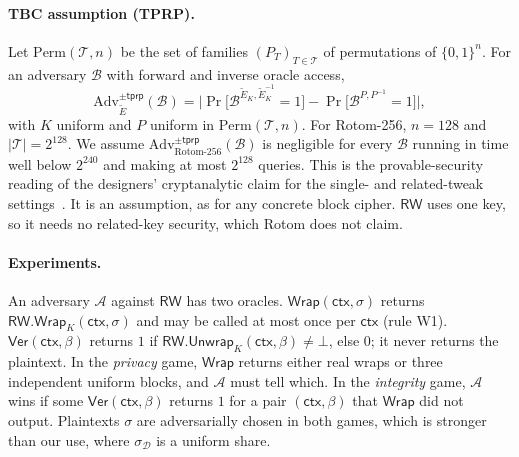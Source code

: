 \documentclass[11pt]{article}
\theoremstyle{remark}
\begin{document}
\paragraph{TBC assumption (TPRP).} Let $\mathrm{Perm}(\mathcal{T}, n)$ be the set of families $(P_T)_{T\in\mathcal{T}}$ of permutations of $\{0,1\}^n$. For an adversary $\mathcal{B}$ with forward and inverse oracle access,
\[
\mathrm{Adv}^{\pm\mathsf{tprp}}_{\widetilde{E}}(\mathcal{B}) = \Big|\Pr\big[\mathcal{B}^{\widetilde{E}_K, \widetilde{E}_K^{-1}} = 1\big] - \Pr\big[\mathcal{B}^{P, P^{-1}} = 1\big]\Big|,
\]
with $K$ uniform and $P$ uniform in $\mathrm{Perm}(\mathcal{T}, n)$. For Rotom-256, $n = 128$ and $|\mathcal{T}| = 2^{128}$. We assume $\mathrm{Adv}^{\pm\mathsf{tprp}}_{\mathrm{Rotom}\text{-}256}(\mathcal{B})$ is negligible for every $\mathcal{B}$ running in time well below $2^{240}$ and making at most $2^{128}$ queries. This is the provable-security reading of the designers' cryptanalytic claim for the single- and related-tweak settings~\cite[§2.4]{rotom26}. It is an assumption, as for any concrete block cipher. $\mathsf{RW}$ uses one key, so it needs no related-key security, which Rotom does not claim.

\paragraph{Experiments.} An adversary $\mathcal{A}$ against $\mathsf{RW}$ has two oracles. $\mathsf{Wrap}(\mathsf{ctx}, \sigma)$ returns $\mathsf{RW.Wrap}_K(\mathsf{ctx}, \sigma)$ and may be called at most once per $\mathsf{ctx}$ (rule W1). $\mathsf{Ver}(\mathsf{ctx}, \beta)$ returns $1$ if $\mathsf{RW.Unwrap}_K(\mathsf{ctx}, \beta) \ne \bot$, else $0$; it never returns the plaintext. In the \emph{privacy} game, $\mathsf{Wrap}$ returns either real wraps or three independent uniform blocks, and $\mathcal{A}$ must tell which. In the \emph{integrity} game, $\mathcal{A}$ wins if some $\mathsf{Ver}(\mathsf{ctx}, \beta)$ returns $1$ for a pair $(\mathsf{ctx}, \beta)$ that $\mathsf{Wrap}$ did not output. Plaintexts $\sigma$ are adversarially chosen in both games, which is stronger than our use, where $\sigma_{\mathcal{D}}$ is a uniform share.
\end{document}
